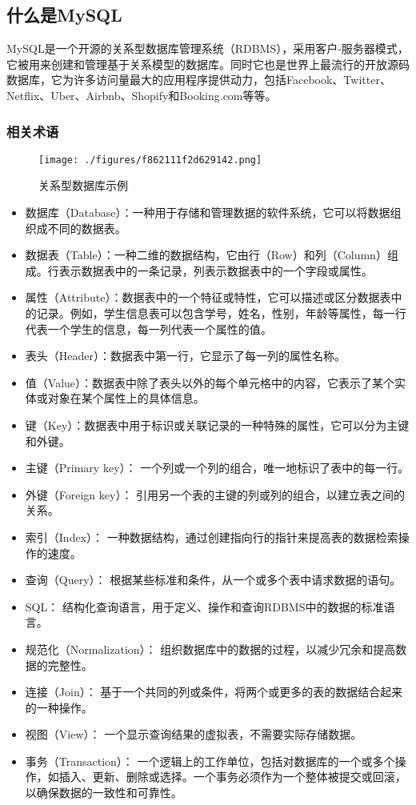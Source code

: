 
\subsection{什么是MySQL}

MySQL是一个开源的关系型数据库管理系统（RDBMS），采用客户-服务器模式，它被用来创建和管理基于关系模型的数据库。同时它也是世界上最流行的开放源码数据库，它为许多访问量最大的应用程序提供动力，包括Facebook、Twitter、Netflix、Uber、Airbnb、Shopify和Booking.com等等。

\subsubsection{相关术语}

\begin{figure}[ht]
\centering
\texttt{[image: ./figures/f862111f2d629142.png]}
\caption{关系型数据库示例} \label{fig_MSQ001_2}
\end{figure}
\begin{itemize}
\item 数据库（Database）：一种用于存储和管理数据的软件系统，它可以将数据组织成不同的数据表。
\item 数据表（Table）：一种二维的数据结构，它由行（Row）和列（Column）组成。行表示数据表中的一条记录，列表示数据表中的一个字段或属性。
\item 属性（Attribute）：数据表中的一个特征或特性，它可以描述或区分数据表中的记录。例如，学生信息表可以包含学号，姓名，性别，年龄等属性，每一行代表一个学生的信息，每一列代表一个属性的值。
\item 表头（Header）：数据表中第一行，它显示了每一列的属性名称。
\item 值（Value）：数据表中除了表头以外的每个单元格中的内容，它表示了某个实体或对象在某个属性上的具体信息。
\item 键（Key）：数据表中用于标识或关联记录的一种特殊的属性，它可以分为主键和外键。
\item 主键（Primary key）： 一个列或一个列的组合，唯一地标识了表中的每一行。
\item 外键（Foreign key）： 引用另一个表的主键的列或列的组合，以建立表之间的关系。
\item 索引（Index）： 一种数据结构，通过创建指向行的指针来提高表的数据检索操作的速度。
\item 查询（Query）： 根据某些标准和条件，从一个或多个表中请求数据的语句。
\item SQL： 结构化查询语言，用于定义、操作和查询RDBMS中的数据的标准语言。
\item 规范化（Normalization）： 组织数据库中的数据的过程，以减少冗余和提高数据的完整性。
\item 连接（Join）： 基于一个共同的列或条件，将两个或更多的表的数据结合起来的一种操作。
\item 视图（View）： 一个显示查询结果的虚拟表，不需要实际存储数据。
\item 事务（Transaction）： 一个逻辑上的工作单位，包括对数据库的一个或多个操作，如插入、更新、删除或选择。一个事务必须作为一个整体被提交或回滚，以确保数据的一致性和可靠性。
\end{itemize}

